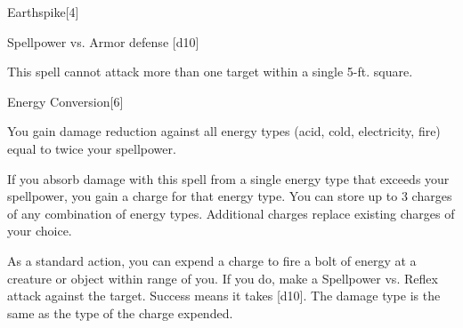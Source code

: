 \begin{spellsection}[Mass]{Earthspike}[4]
    \begin{spellheader}
    \end{spellheader}
    \begin{spellcontent}
        \begin{spelltargetinginfo}
        \end{spelltargetinginfo}
        \begin{spelleffects}
            \begin{spellattack}{Spellpower vs. Armor defense}
                \spellsuccess {}[d10]
            \end{spellattack}
        \end{spelleffects}
    \end{spellcontent}
    \begin{spellfooter}
        \spellnotes This spell cannot attack more than one target within a single 5-ft. square.
        \miscastexplode
    \end{spellfooter}
\end{spellsection}

\begin{spellsection}{Energy Conversion}[6]
    \begin{spellheader}
    \end{spellheader}
    \begin{spellcontent}
        \begin{spelleffects}
            \spelleffect You gain damage reduction against all energy types (acid, cold, electricity, fire) equal to twice your spellpower.

            If you absorb damage with this spell from a single energy type that exceeds your spellpower, you gain a charge for that energy type. You can store up to 3 charges of any combination of energy types. Additional charges replace existing charges of your choice.

            As a standard action, you can expend a charge to fire a bolt of energy at a creature or object within \rngclose range of you. If you do, make a Spellpower vs. Reflex attack against the target. Success means it takes [d10]. The damage type is the same as the type of the charge expended.
        \end{spelleffects}
    \end{spellcontent}
    \begin{spellfooter}
        \miscastexplode
    \end{spellfooter}
\end{spellsection}


